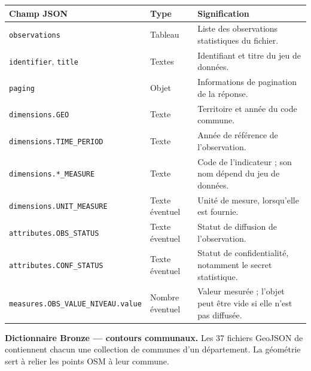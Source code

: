 \documentclass[11pt,a4paper]{article}
\begin{document}
\begin{center}
\small
\begin{tabular}{@{}p{4.8cm}p{2.5cm}p{7.6cm}@{}}
\toprule
Champ JSON & Type & Signification \\
\midrule
\texttt{observations} & Tableau & Liste des observations statistiques du fichier. \\
\texttt{identifier}, \texttt{title} & Textes & Identifiant et titre du jeu de données. \\
\texttt{paging} & Objet & Informations de pagination de la réponse. \\
\texttt{dimensions.GEO} & Texte & Territoire et année du code commune. \\
\texttt{dimensions.TIME\_PERIOD} & Texte & Année de référence de l'observation. \\
\texttt{dimensions.*\_MEASURE} & Texte & Code de l'indicateur ; son nom dépend du jeu de données. \\
\texttt{dimensions.UNIT\_MEASURE} & Texte éventuel & Unité de mesure, lorsqu'elle est fournie. \\
\texttt{attributes.OBS\_STATUS} & Texte éventuel & Statut de diffusion de l'observation. \\
\texttt{attributes.CONF\_STATUS} & Texte éventuel & Statut de confidentialité, notamment le secret statistique. \\
\texttt{measures.}\newline\texttt{OBS\_VALUE\_NIVEAU.value} & Nombre éventuel & Valeur mesurée ; l'objet peut être vide si elle n'est pas diffusée. \\
\bottomrule
\end{tabular}
\end{center}

\noindent\textbf{Dictionnaire Bronze --- contours communaux.} Les \num{37} fichiers GeoJSON de  contiennent chacun une collection de communes d'un département. La géométrie sert à relier les points OSM à leur commune.
\end{document}
